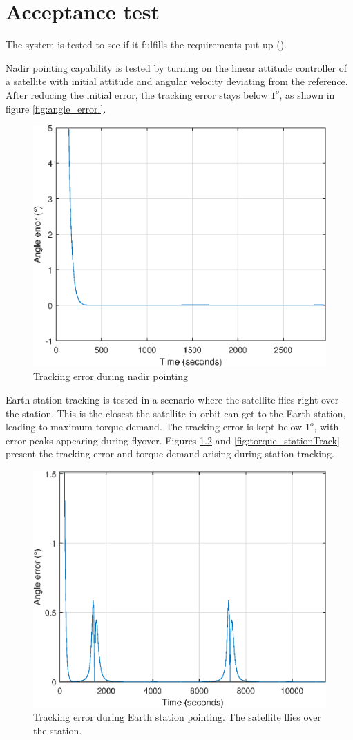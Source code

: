\chapter{Acceptance test} \label{chap:acceptanceTest}

The system is tested to see if it fulfills the requirements put up ().

Nadir pointing capability is tested by turning on the linear attitude controller of a satellite with initial attitude and angular velocity deviating from the reference. After reducing the initial error, the tracking error stays below $1^o$, as shown in figure \ref{fig:angle_error.}.

\begin{figure}[H]
	\centering
	\includegraphics[width=0.7\linewidth]{figures/angle_error}
	\caption{Tracking error during nadir pointing}
	\label{fig:angle_error}
\end{figure}

Earth station tracking is  tested in a scenario where the satellite flies right over the station. This is the closest the satellite in orbit can get to the Earth station, leading to maximum torque demand. The tracking error is kept below  $1^o$, with error peaks appearing during flyover. Figures \ref{fig:angle_error2} and \ref{fig:torque_stationTrack} present the tracking error and torque demand arising during station tracking.

\begin{figure}[H]
	\centering
	\includegraphics[width=0.7\linewidth]{figures/angle_error_stationTrack}
	\caption{Tracking error during Earth station pointing. The satellite flies over the station.}
	\label{fig:angle_error2}
\end{figure}


